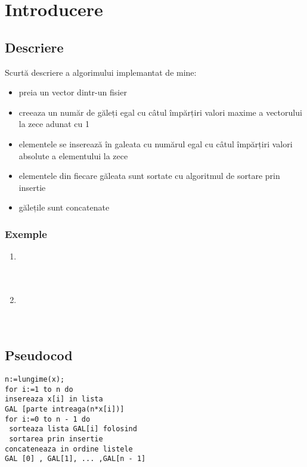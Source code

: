 \chapter{Introducere}
\section{Descriere}
    \LARGE{Scurtă descriere a algorimului implemantat de mine:}
    \begin{itemize}
        \item \LARGE{preia un vector dintr-un fisier}
        \item \LARGE{creeaza un număr de găleți egal cu câtul împărțiri valori maxime a vectorului la zece adunat cu 1 }
        \item \LARGE{elementele se inserează în galeata cu numărul egal cu câtul împărțiri valori absolute a elementului la zece}
        \item \LARGE{elementele din fiecare găleata sunt sortate cu algoritmul de sortare prin insertie}
        \item \LARGE{gălețile sunt concatenate}
    \end{itemize}


\subsection{Exemple}
\begin{enumerate}
    \item {
           \\
      \\
      \\
    }
    \vskip 0.5cm
    \item {
             \\
       \\
       \\
    } 
\end{enumerate}

\vskip 0.5cm

\section{Pseudocod}
\nocite{Geeks}
\begin{lstlisting}
n:=lungime(x);
for i:=1 to n do
insereaza x[i] in lista 
GAL [parte intreaga(n*x[i])]
for i:=0 to n - 1 do
 sorteaza lista GAL[i] folosind
 sortarea prin insertie
concateneaza in ordine listele 
GAL [0] , GAL[1], ... ,GAL[n - 1]
\end{lstlisting}